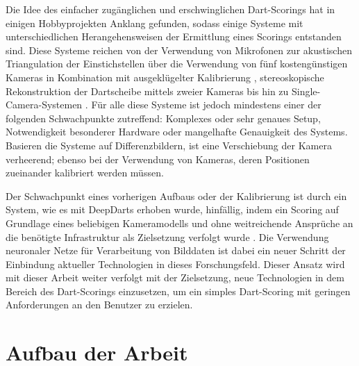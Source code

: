 Die Idee des einfacher zugänglichen und erschwinglichen Dart-Scorings hat in einigen Hobbyprojekten Anklang gefunden, sodass einige Systeme mit unterschiedlichen Herangehensweisen der Ermittlung eines Scorings entstanden sind. Diese Systeme reichen von der Verwendung von Mikrofonen zur akustischen Triangulation der Einstichstellen \cite{dart_scoring_microphone} über die Verwendung von fünf kostengünstigen Kameras in Kombination mit ausgeklügelter Kalibrierung \cite{dart_scoring_multicam}, stereoskopische Rekonstruktion der Dartscheibe mittels zweier Kameras \cite{darts_project_3,darts_project_4} bis hin zu Single-Camera-Systemen \cite{darts_project_1,darts_project_2}. Für alle diese Systeme ist jedoch mindestens einer der folgenden Schwachpunkte zutreffend: Komplexes oder sehr genaues Setup, Notwendigkeit besonderer Hardware oder mangelhafte Genauigkeit des Systems. Basieren die Systeme auf Differenzbildern, ist eine Verschiebung der Kamera verheerend; ebenso bei der Verwendung von Kameras, deren Positionen zueinander kalibriert werden müssen.

Der Schwachpunkt eines vorherigen Aufbaus oder der Kalibrierung ist durch ein System, wie es mit DeepDarts erhoben wurde, hinfällig, indem ein Scoring auf Grundlage eines beliebigen Kameramodells und ohne weitreichende Ansprüche an die benötigte Infrastruktur als Zielsetzung verfolgt wurde \cite{deepdarts}. Die Verwendung neuronaler Netze für Verarbeitung von Bilddaten ist dabei ein neuer Schritt der Einbindung aktueller Technologien in dieses Forschungsfeld. Dieser Ansatz wird mit dieser Arbeit weiter verfolgt mit der Zielsetzung, neue Technologien in dem Bereich des Dart-Scorings einzusetzen, um ein simples Dart-Scoring mit geringen Anforderungen an den Benutzer zu erzielen.



\section{Aufbau der Arbeit}
\label{sec:aufbau}

